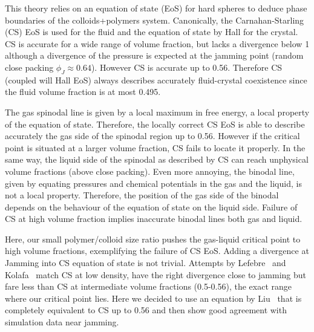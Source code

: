 This theory relies on an equation of state (EoS) for hard spheres to deduce phase boundaries of the colloids+polymers system. Canonically, the Carnahan-Starling (CS) EoS is used for the fluid and the equation of state by Hall for the crystal. CS is accurate for a wide range of volume fraction, but lacks a divergence below 1 although a divergence of the pressure is expected at the jamming point (random close packing $\phi_J\approx 0.64$). However CS is accurate up to 0.56. Therefore CS (coupled will Hall EoS) always describes accurately fluid-crystal coexistence since the fluid volume fraction is at most 0.495.

The gas spinodal line is given by a local maximum in free energy, a local property of the equation of state. Therefore, the locally correct CS EoS is able to describe accurately the gas side of the spinodal region up to 0.56. However if the critical point is situated at a larger volume fraction, CS fails to locate it properly. In the same way, the liquid side of the spinodal as described by CS can reach unphysical volume fractions (above close packing). Even more annoying, the binodal line, given by equating pressures and chemical potentials in the gas and the liquid, is not a local property. Therefore, the position of the gas side of the binodal depends on the behaviour of the equation of state on the liquid side. Failure of CS at high volume fraction implies inaccurate binodal lines both gas and liquid.

Here, our small polymer/colloid size ratio pushes the gas-liquid critical point to high volume fractions, exemplifying the failure of CS EoS. Adding a divergence at Jamming into CS equation of state is not trivial. Attempts by Lefebre~\cite{LeFevre1972} and Kolafa~\cite{Kolafa2004} match CS at low density, have the right divergence close to jamming but fare less than CS at intermediate volume fractions (0.5-0.56), the exact range where our critical point lies. Here we decided to use an equation by Liu~\cite{Liu2006a} that is completely equivalent to CS up to 0.56 and then show good agreement with simulation data near jamming.

